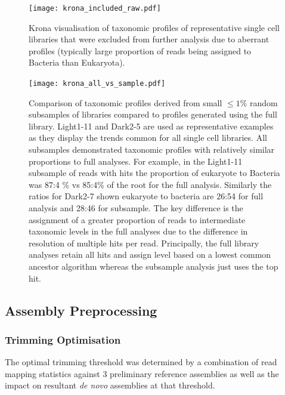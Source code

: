 \begin{figure}[h]
    \texttt{[image: krona\_included\_raw.pdf]}
    \caption{
    Krona visualisation of taxonomic profiles of representative
    single cell libraries that were excluded from further analysis due 
    to aberrant profiles (typically large proportion of reads being assigned
    to Bacteria than Eukaryota).  
    }
    \label{fig:krona_included}
\end{figure}


\begin{figure}[h]
    \texttt{[image: krona\_all\_vs\_sample.pdf]}
    \caption{Comparison of taxonomic profiles derived from small \(\leq1\%\)
        random subsamples of libraries compared to profiles generated using the
        full library.  Light1-11 and Dark2-5 are used as representative examples
        as they display the trends common for all single cell libraries. 
        All subsamples demonstrated taxonomic profiles with relatively similar
        proportions to full analyses.  For example, in the Light1-11 subsample
        of reads with hits the proportion of eukaryote to Bacteria was 87:4 
        \% vs 85:4\% of the root for the full analysis. Similarly the ratios
        for Dark2-7 shown eukaryote to bacteria are 26:54 for full analysis
        and 28:46 for subsample. 
        The key difference is the assignment of a greater proportion of reads to 
        intermediate taxonomic levels in the full analyses due to the difference in 
        resolution of multiple hits per read.  Principally, the full library analyses
        retain all hits and assign level based on a lowest common ancestor algorithm
        whereas the subsample analysis just uses the top hit.
    }
    \label{fig:krona_sample_vs_full}
\end{figure}


\subsection{Assembly Preprocessing} 

\subsubsection{Trimming Optimisation}

The optimal trimming threshold was determined by a combination
of read mapping statistics against 3 preliminary reference assemblies
as well as the impact on resultant \textit{de novo} assemblies at 
that threshold.

